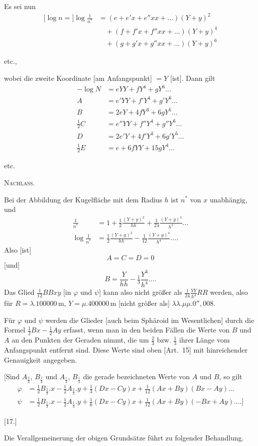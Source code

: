 Es sei nun
\[
\begin{aligned}
\mathopen{[}\log n=]\log\frac1{n^*}&=(e+e'x+e''xx+\ldots)(Y+y)^2\\
&\quad+(f+f'x+f''xx+\ldots)(Y+y)^4\\
&\quad+(g+g'x+g''xx+\ldots)(Y+y)^6
\end{aligned}
\]
\begin{center}etc.,\end{center}
wobei die zweite Koordinate [am Anfangspunkt] $=Y$ [ist]. Dann gilt
\[
\begin{aligned}
-\log N&=eYY+fY^4+gY^6\ldots\\
A&=e'YY+f'Y^4+g'Y^6\ldots\\
B&=2eY+4fY^3+6gY^5\ldots\\
\tfrac12C&=e''YY+f''Y^4+g''Y^6\ldots\\
D&=2e'Y+4f'Y^3+6g'Y^5\ldots\\
\tfrac12E&=e+6fYY+15gY^4\ldots
\end{aligned}
\]
\begin{center}etc.\end{center}
\par\endgroup
\clearpage
{}\hfill\textsc{Nachlass.}\hfill\mbox{}\par\medskip
Bei der Abbildung der Kugelfläche mit dem Radius $h$ ist $n^*$ von $x$ unabhängig, und
\[
\begin{aligned}
\frac1{n^*}&=1+\tfrac12\frac{(Y+y)^2}{hh}+\tfrac1{24}\frac{(Y+y)^4}{h^4}\ldots\\
\log\frac1{n^*}&=\tfrac12\frac{(Y+y)^2}{hh}-\tfrac1{12}\frac{(Y+y)^4}{h^4}\ldots.
\end{aligned}
\]
Also [ist]
\[
A=C=D=0
\]
[und]
\[
B=\frac{Y}{hh}-\tfrac13\frac{Y^3}{h^4}\ldots.
\]
Das Glied $\tfrac1{12}BBxy$ [in $\varphi$ und $\psi$] kann also nicht größer als $\tfrac1{24}\frac{YY}{h^4}RR$ werden, also für $R=\lambda.100000\,\mathrm m$, $Y=\mu.400000\,\mathrm m$ [nicht größer als] $\lambda\lambda.\mu\mu.0''{,}008$.

Für $\varphi$ und $\psi$ werden die Glieder [auch beim Sphäroid im Wesentlichen] durch die Formel $\tfrac12Bx-\tfrac12Ay$ erfasst, wenn man in den beiden Fällen die Werte von $B$ und $A$ an den Punkten der Geraden nimmt, die um $\frac23$ bzw. $\frac13$ ihrer Länge vom Anfangspunkt entfernt sind. Diese Werte sind oben [Art.~15] mit hinreichender Genauigkeit angegeben.

[Sind $A_{\frac23}$, $B_{\frac23}$ und $A_{\frac13}$, $B_{\frac13}$ die gerade bezeichneten Werte von $A$ und $B$, so gilt
\[
\begin{aligned}
\varphi&=\tfrac12B_{\frac23}.x-\tfrac12A_{\frac23}.y+\tfrac13(Dx-Cy)x+\tfrac1{12}(Ax+By)(Bx-Ay)\ldots\\
\psi&=\tfrac12B_{\frac13}.x-\tfrac12A_{\frac13}.y+\tfrac16(Dx-Cy)x+\tfrac1{12}(Ax+By)(-Bx+Ay)\ldots.]
\end{aligned}
\]
\begin{center}[17.]\end{center}
Die Verallgemeinerung der obigen Grundsätze führt zu folgender Behandlung.

